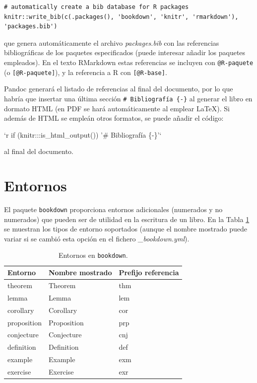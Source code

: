 \documentclass[]{book}
\newenvironment{Shaded}{\begin{snugshade}}{\end{snugshade}}
\newcommand{\BaseNTok}[1]{\textcolor[rgb]{0.00,0.00,0.81}{#1}}
\theoremstyle{definition}
\theoremstyle{definition}
\theoremstyle{definition}
\theoremstyle{remark}
\begin{document}
\begin{verbatim}
# automatically create a bib database for R packages
knitr::write_bib(c(.packages(), 'bookdown', 'knitr', 'rmarkdown'), 'packages.bib')
\end{verbatim}

que genera automáticamente el archivo \emph{packages.bib} con las
referencias bibliográficas de los paquetes especificados (puede
interesar añadir los paquetes empleados). En el texto RMarkdown estas
referencias se incluyen con \texttt{@R-paquete} (o
\texttt{{[}@R-paquete{]}}), y la referencia a R \citep{R-base} con
\texttt{{[}@R-base{]}}.

Pandoc generará el listado de referencias al final del documento, por lo
que habría que insertar una última sección
\texttt{\#\ Bibliografía\ \{-\}} al generar el libro en dormato HTML (en
PDF se hará automáticamente al emplear LaTeX). Si además de HTML se
empleán otros formatos, se puede añadir el código:

\begin{Shaded}
\begin{Highlighting}[]
\BaseNTok{`r if (knitr:::is_html_output()) '# Bibliografía \{-\}'`}
\end{Highlighting}
\end{Shaded}

al final del documento.

\section{Entornos}\label{entornos}

El paquete \texttt{bookdown} proporciona entornos adicionales (numerados
y no numerados) que pueden ser de utilidad en la escritura de un libro.
En la Tabla \ref{tab:theorem-envs} se muestran los tipos de entorno
soportados (aunque el nombre mostrado puede variar si se cambió esta
opción en el fichero \emph{\_bookdown.yml}).



\begin{table}[t]

\caption{\label{tab:theorem-envs}Entornos en \texttt{bookdown}.}
\centering
\begin{tabular}{lll}
\toprule
Entorno & Nombre mostrado & Prefijo referencia\\
\midrule
theorem & Theorem & thm\\
lemma & Lemma & lem\\
corollary & Corollary & cor\\
proposition & Proposition & prp\\
conjecture & Conjecture & cnj\\
\addlinespace
definition & Definition & def\\
example & Example & exm\\
exercise & Exercise & exr\\
\bottomrule
\end{tabular}
\end{table}
\end{document}

